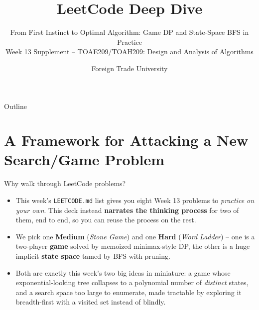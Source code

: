 \documentclass[11pt,aspectratio=169]{beamer}
\title{LeetCode Deep Dive}
\subtitle{From First Instinct to Optimal Algorithm: Game DP and State-Space BFS in
Practice\\
\small Week 13 Supplement -- TOAE209/TOAH209: Design and Analysis of Algorithms}
\author{Foreign Trade University}
\date{}
\begin{document}
\begin{frame}
  \titlepage
\end{frame}

\begin{frame}{Outline}
  \tableofcontents
\end{frame}

\section{A Framework for Attacking a New Search/Game Problem}

\begin{frame}{Why walk through LeetCode problems?}
  \begin{itemize}
    \item This week's \texttt{LEETCODE.md} list gives you eight Week 13 problems to
    \emph{practice on your own}. This deck instead \textbf{narrates the thinking
    process} for two of them, end to end, so you can reuse the process on the rest.
    \item We pick one \textcolor{blue!50!black}{\textbf{Medium}} (\emph{Stone Game}) and
    one \textcolor{red!60!black}{\textbf{Hard}} (\emph{Word Ladder}) -- one is a
    two-player \textbf{game} solved by memoized minimax-style DP, the other is a huge
    implicit \textbf{state space} tamed by BFS with pruning.
    \item Both are exactly this week's two big ideas in miniature: a game whose
    exponential-looking tree collapses to a polynomial number of \emph{distinct}
    states, and a search space too large to enumerate, made tractable by exploring it
    breadth-first with a visited set instead of blindly.
  \end{itemize}
\end{frame}
\end{document}
